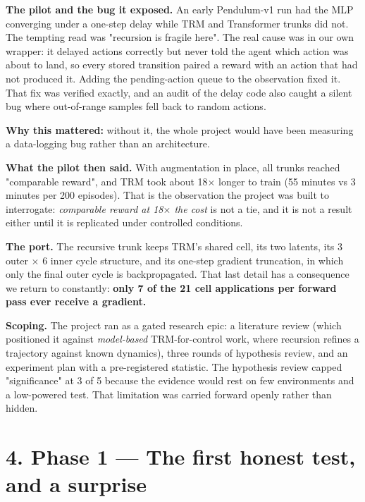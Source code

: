 \documentclass[11pt]{article}
\begin{document}
\textbf{The pilot and the bug it exposed.} An early Pendulum-v1 run had the MLP converging under a one-step delay while TRM and Transformer trunks did not. The tempting read was "recursion is fragile here". The real cause was in our own wrapper: it delayed actions correctly but never told the agent which action was about to land, so every stored transition paired a reward with an action that had not produced it. Adding the pending-action queue to the observation fixed it. That fix was verified exactly, and an audit of the delay code also caught a silent bug where out-of-range samples fell back to random actions.



\textbf{Why this mattered:} without it, the whole project would have been measuring a data-logging bug rather than an architecture.



\textbf{What the pilot then said.} With augmentation in place, all trunks reached "comparable reward", and TRM took about 18$\times$ longer to train (55 minutes vs 3 minutes per 200 episodes). That is the observation the project was built to interrogate: \emph{comparable reward at 18$\times$ the cost} is not a tie, and it is not a result either until it is replicated under controlled conditions.



\textbf{The port.} The recursive trunk keeps TRM's shared cell, its two latents, its 3 outer $\times$ 6 inner cycle structure, and its one-step gradient truncation, in which only the final outer cycle is backpropagated. That last detail has a consequence we return to constantly: \textbf{only 7 of the 21 cell applications per forward pass ever receive a gradient.}



\textbf{Scoping.} The project ran as a gated research epic: a literature review (which positioned it against \emph{model-based} TRM-for-control work, where recursion refines a trajectory against known dynamics), three rounds of hypothesis review, and an experiment plan with a pre-registered statistic. The hypothesis review capped "significance" at 3 of 5 because the evidence would rest on few environments and a low-powered test. That limitation was carried forward openly rather than hidden.



\section*{4. Phase 1 --- The first honest test, and a surprise}
\end{document}
